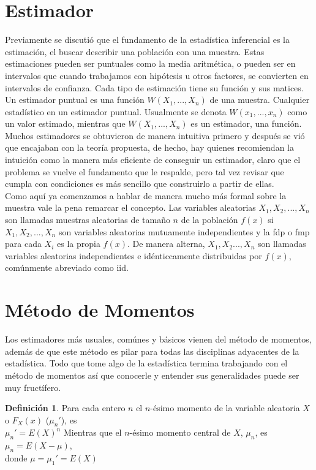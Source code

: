 \documentclass[11pt,a4paper,oneside]{report}
\theoremstyle{definition}
\newtheorem{definicion}{Definición}[chapter]
\theoremstyle{plain}
\theoremstyle{remark}
\begin{document}
\section{Estimador}
Previamente se discutió que el fundamento de la estadística inferencial es la estimación, el buscar describir una población 
con una muestra. Estas estimaciones pueden ser puntuales como la media aritmética, o pueden ser en intervalos que cuando 
trabajamos con hipótesis u otros factores, se convierten en intervalos de confianza. Cada tipo de estimación tiene su función 
y sus matices. \\
Un estimador puntual es una función $W(X_1,...,X_n)$ de una muestra. Cualquier estadístico en un estimador puntual.
Usualmente se denota $W(x_1,...,x_n)$ como un valor estimado, mientras que $W(X_1,...,X_n)$ es un estimador, una función.
Muchos estimadores se obtuvieron de manera intuitiva primero y después se vió que encajaban con la teoría propuesta, de hecho, 
hay quienes recomiendan la intuición como la manera más eficiente de conseguir un estimador, claro que el problema se vuelve 
el fundamento que le respalde, pero tal vez revisar que cumpla con condiciones es más sencillo que construirlo a partir de ellas.\\
Como aquí ya comenzamos a hablar de manera mucho más formal sobre la muestra vale la pena remarcar el concepto.
Las variables aleatorias $X_1,X_2,...,X_n$ son llamadas muestras aleatorias de tamaño $n$ de la población
$f(x)$ si $X_1,X_2,...,X_n$ son variables aleatorias mutuamente independientes y la fdp o fmp para cada $X_i$
es la propia $f(x)$. De manera alterna, $X_1,X_2...,X_n$ son llamadas variables aleatorias independientes e idénticcamente 
distribuidas por $f(x)$, comúnmente abreviado como iid.

\section{Método de Momentos}

Los estimadores más usuales, comúnes y básicos vienen del método de momentos, además de que este método es pilar para todas 
las disciplinas adyacentes de la estadística. Todo que tome algo de la estadística termina trabajando con el método de momentos
así que conocerle y entender sus generalidades puede ser muy fructífero. 

\begin{definicion}
  Para cada entero $n$ el $n$-ésimo momento de la variable aleatoria $X$ o $F_{X}(x)$ ($\mu_{n} '$), es
  \\ $\mu_{n} '=E(X)^n$ 
  Mientras que el $n$-ésimo momento central de $X$, $\mu_{n} $, es
  \\ $\mu_{n}=E(X-\mu)$,
  \\ donde $\mu = \mu_{1} '=E(X)$
\end{definicion}
\end{document}
